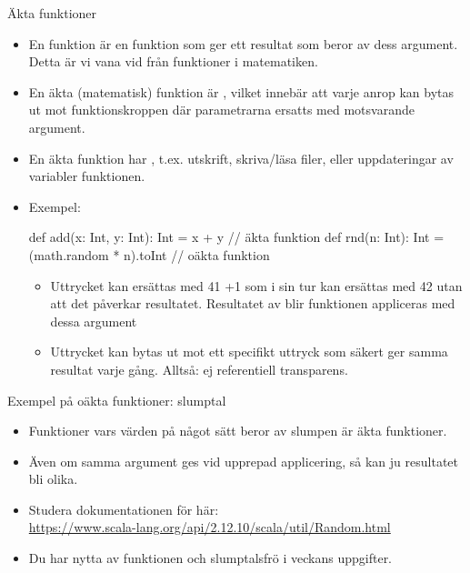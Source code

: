 \begin{Slide}{Äkta funktioner}
\begin{itemize}\SlideFontSmall
\item En  funktion är en funktion som ger ett resultat som  beror av dess argument. Detta är vi vana vid från funktioner i matematiken.
\item En äkta (matematisk) funktion är  , vilket innebär att varje anrop kan bytas ut mot funktionskroppen där parametrarna ersatts med motsvarande argument.
\item En äkta funktion har , t.ex. utskrift, skriva/läsa filer,  eller uppdateringar av variabler  funktionen.
\item Exempel:
\begin{Code}
def add(x: Int, y: Int): Int = x + y            // äkta funktion
def rnd(n: Int): Int = (math.random * n).toInt  // oäkta funktion
\end{Code} 
\begin{itemize}\SlideFontTiny

\item Uttrycket  kan ersättas med 41 +1 som i sin tur kan ersättas med 42 utan att det påverkar resultatet. Resultatet av  blir  funktionen appliceras med dessa argument
\item Uttrycket  kan  bytas ut mot ett specifikt uttryck som säkert ger samma resultat varje gång. Alltså: ej referentiell transparens.
\end{itemize}  
\end{itemize}  
\end{Slide}

\begin{Slide}{Exempel på oäkta funktioner: slumptal}

  \begin{itemize}
    \item Funktioner vars värden på något sätt beror av slumpen är  äkta funktioner.
    \item Även om samma argument ges vid upprepad applicering, så kan ju resultatet bli olika.
    \item Studera dokumentationen för  här:\\ \href{https://www.scala-lang.org/api/2.12.10/scala/util/Random.html}{\SlideFontSmall https://www.scala-lang.org/api/2.12.10/scala/util/Random.html}
    \item Du har nytta av funktionen  och slumptalsfrö  i veckans uppgifter.
  \end{itemize}

\end{Slide}


